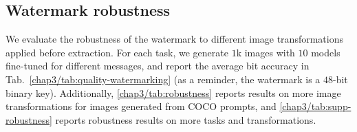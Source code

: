\subsection{Watermark robustness}\label{chap3/subsec:robustness}

We evaluate the robustness of the watermark to different image transformations applied before extraction.
For each task, we generate $1$k images with $10$ models fine-tuned for different messages, and report the average bit accuracy in Tab.~\ref{chap3/tab:quality-watermarking} (as a reminder, the watermark is a $48$-bit binary key).
Additionally, \autoref{chap3/tab:robustness} reports results on more image transformations for images generated from COCO prompts, and \autoref{chap3/tab:supp-robustness} reports robustness results on more tasks and transformations.




\begin{table}[t!]
    \centering
    \caption{
        Watermark robustness to transformations.
        We report the bit accuracy, averaged over $10\times1$k images generated from COCO prompts with $10$ different keys.
    }\label{chap3/tab:robustness}
    \footnotesize
    \setlength{\tabcolsep}{4pt}
\end{table}


